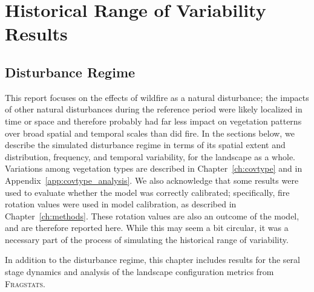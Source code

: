 \chapter{Historical Range of Variability Results}
\label{ch:results}
\section{Disturbance Regime}

This report focuses on the effects of wildfire as a natural disturbance; the impacts of other natural disturbances during the reference period were likely localized in time or space and therefore probably had far less impact on vegetation patterns over broad spatial and temporal scales than did fire. In the sections below, we describe the simulated disturbance regime in terms of its spatial extent and distribution, frequency, and temporal variability, for the landscape as a whole. Variations among vegetation types are described in Chapter~\ref{ch:covtype} and in Appendix~\ref{app:covtype_analysis}. We also acknowledge that some results were used to evaluate whether the model was correctly calibrated; specifically, fire rotation values were used in model calibration, as described in Chapter~\ref{ch:methods}. These rotation values are also an outcome of the model, and are therefore reported here. While this may seem a bit circular, it was a necessary part of the process of simulating the historical range of variability. 

In addition to the disturbance regime, this chapter includes results for the seral stage dynamics and analysis of the landscape configuration metrics from \textsc{Fragstats}.


